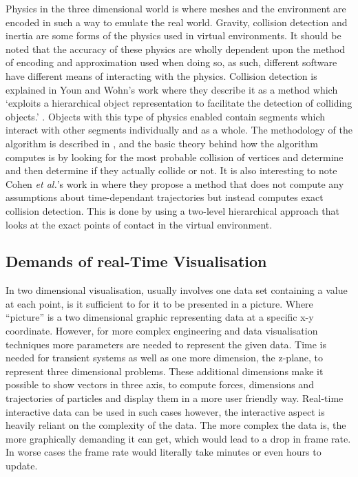 Physics in the three dimensional world is where meshes and the environment are encoded in such a way to emulate the real world. Gravity, collision detection and inertia are some forms of the physics used in virtual environments. It should be noted that the accuracy of these physics are wholly dependent upon the method of encoding and approximation used when doing so, as such, different software have different means of interacting with the physics. Collision detection is explained in Youn and Wohn's work where they describe it as a method which `exploits a hierarchical object representation to facilitate the detection of colliding objects.' \cite{youn1993realtime}. Objects with this type of physics enabled contain segments which interact with other segments individually and as a whole. The methodology of the algorithm is described in \cite{jayaram1997virtual}, and the basic theory behind how the algorithm computes is by looking for the most probable collision of vertices and determine and then determine if they actually collide or not. It is also interesting to note Cohen \textit{et al.}'s work in \cite{cohen1994interactive} where they propose a method that does not compute any assumptions about time-dependant trajectories but instead computes exact collision detection. This is done by using a two-level hierarchical approach that looks at the exact points of contact in the virtual environment.


\subsection{Demands of real-Time Visualisation}
In two dimensional visualisation, usually involves one data set containing a value at each point, is it sufficient to for it to be presented in a picture. Where ``picture'' is a two dimensional graphic representing data at a specific x-y coordinate. However, for more complex engineering and data visualisation techniques more parameters are needed to represent the given data. Time is needed for transient systems as well as one more dimension, the z-plane, to represent three dimensional problems. These additional dimensions make it possible to show vectors in three axis, to compute forces, dimensions and trajectories of particles and display them in a more user friendly way. Real-time interactive data can be used in such cases however, the interactive aspect is heavily reliant on the complexity of the data. The more complex the data is, the more graphically demanding it can get, which would lead to a drop in frame rate. In worse cases the frame rate would literally take minutes or even hours to update. 

